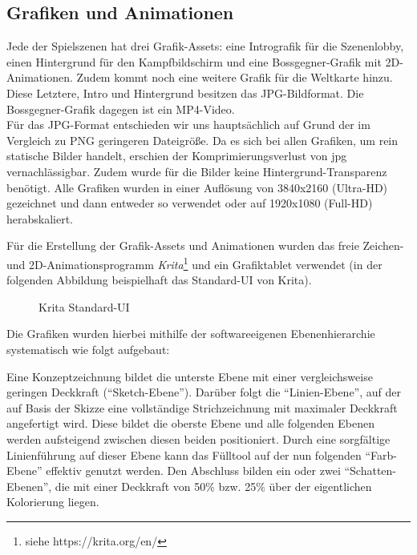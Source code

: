 

\subsection{Grafiken und Animationen}


Jede der Spielszenen hat drei Grafik-Assets: eine Intrografik für die Szenenlobby, einen Hintergrund für den Kampfbildschirm und eine Bossgegner-Grafik mit 2D-Animationen. Zudem kommt noch eine weitere Grafik für die Weltkarte hinzu. Diese Letztere, Intro und Hintergrund besitzen das JPG-Bildformat. Die Bossgegner-Grafik dagegen ist ein MP4-Video.
\\Für das JPG-Format entschieden wir uns hauptsächlich auf Grund der im Vergleich zu PNG geringeren Dateigröße. Da es sich bei allen Grafiken, um rein statische Bilder handelt, erschien der Komprimierungsverlust von jpg vernachlässigbar. Zudem wurde für die Bilder keine Hintergrund-Transparenz benötigt.
Alle Grafiken wurden in einer Auflösung von 3840x2160 (Ultra-HD) gezeichnet und dann entweder so verwendet oder auf 1920x1080 (Full-HD) herabskaliert. 

Für die Erstellung der Grafik-Assets und Animationen wurden das freie Zeichen- und 2D-Animationsprogramm \textit{Krita}\footnote{siehe https://krita.org/en/} und ein Grafiktablet verwendet (in der folgenden Abbildung beispielhaft das Standard-UI von Krita).   

\begin{figure}[H]
    \centering
    \caption{Krita Standard-UI}
    \label{fig:krita_ui_example}
\end{figure}

Die Grafiken wurden hierbei mithilfe der softwareeigenen Ebenenhierarchie systematisch wie folgt aufgebaut: 

Eine Konzeptzeichnung bildet die unterste Ebene mit einer vergleichsweise geringen Deckkraft (\enquote{Sketch-Ebene}). Darüber folgt die \enquote{Linien-Ebene}, auf der auf Basis der Skizze eine vollständige Strichzeichnung mit maximaler Deckkraft angefertigt wird. Diese bildet die oberste Ebene und alle folgenden Ebenen werden aufsteigend zwischen diesen beiden positioniert. Durch eine sorgfältige Linienführung auf dieser Ebene kann das Fülltool auf der nun folgenden \enquote{Farb-Ebene} effektiv genutzt werden. Den Abschluss bilden ein oder zwei \enquote{Schatten-Ebenen}, die mit einer Deckkraft von 50\% bzw. 25\% über der eigentlichen Kolorierung liegen. 

